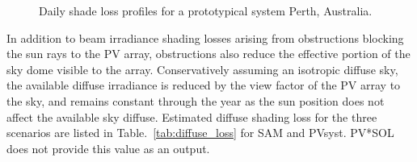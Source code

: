 \documentclass[twocolumn,10pt]{asme2ej}
\begin{document}
\begin{figure}[h!]
\begin{center}
\end{center}
\caption{Daily shade loss profiles for a prototypical system Perth, Australia.}
\label{fig:simple_perth}
\end{figure}


In addition to beam irradiance shading losses arising from obstructions blocking the sun rays to the PV array, obstructions also reduce the effective portion of the sky dome visible to the array.  Conservatively assuming an isotropic diffuse sky, the available diffuse irradiance is reduced by the view factor of the PV array to the sky, and remains constant through the year as the sun position does not affect the available sky diffuse.  Estimated diffuse shading loss for the three scenarios are listed in Table.~\ref{tab:diffuse_loss} for SAM and PVsyst.  PV*SOL does not provide this value as an output.
\end{document}
